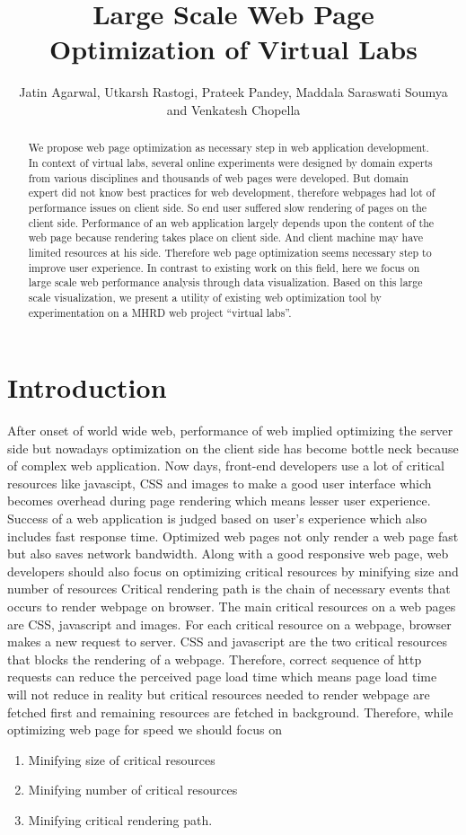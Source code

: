\documentclass[conference]{IEEEtran}
\title{Large Scale Web Page Optimization of Virtual Labs}
\author{Jatin Agarwal, Utkarsh Rastogi, Prateek Pandey, Maddala Saraswati Soumya and Venkatesh Chopella}
\begin{document}
\maketitle

\begin{abstract}
We propose web page optimization as necessary step in web application
development. In context of virtual labs, several online experiments were designed by domain
experts from various disciplines and thousands of web pages were developed.
But domain expert did not know best practices for web development, therefore
webpages had lot of performance issues on client side. So end user suffered slow
rendering of pages on the client side.
Performance of an web application largely depends upon the content of the web
page because rendering takes place on client side. 
And client machine may have limited resources at his side. Therefore web page
optimization seems necessary step to improve user experience.
In contrast to existing work on this field, here we focus on large scale web
performance analysis through data visualization. Based on this large scale visualization,
we present a utility of existing web optimization tool by experimentation on a
MHRD web project ``virtual labs''.
\end{abstract}

\section{Introduction}\label{sec-2}
After onset of world wide web, performance of web implied optimizing the server side but nowadays
optimization on the client side has become bottle neck because of complex web
application. Now days, front-end developers use a lot of critical resources like
javascipt, CSS and images to make a good user interface which becomes
overhead during page rendering which means lesser user experience. Success of a web
application is judged based on user's experience which also includes fast response
time. Optimized web pages not only render a web page fast but also saves network
bandwidth. Along with a good responsive web page, web developers should
also focus on optimizing critical resources by minifying size and number of resources
Critical rendering path is the chain of necessary events that
occurs to render webpage on browser. The main critical resources on a web
pages are CSS, javascript and images. For each critical resource on a
webpage, browser makes a new request to server. CSS and javascript are the two
critical resources that blocks the rendering of a webpage. Therefore, correct
sequence of http requests can reduce the perceived page load time which means page
load time will not reduce in reality but critical resources needed to render webpage are
fetched first and remaining resources are fetched in background. Therefore,
while optimizing web page for speed we should focus on 
\begin{enumerate}
 \item Minifying size of critical resources
 \item Minifying number of critical resources
 \item Minifying critical rendering path.
\end{enumerate}
\end{document}

